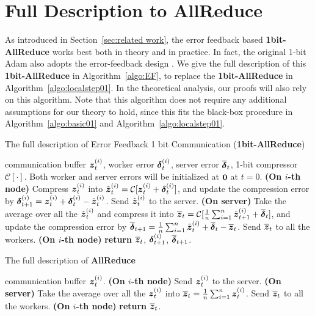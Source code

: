 \section{Full Description to AllReduce}
\label{appendix:sec:algorithm}

As introduced in Section~\ref{sec:related work}, the error feedback based \textbf{1bit-AllReduce} works best both in theory and in practice. In fact, the original 1-bit Adam also adopts the error-feedback design \citep{tang20211}. We give the full description of this \textbf{1bit-AllReduce} in Algorithm~\ref{algo:EF}, to replace the \textbf{1bit-AllReduce} in Algorithm~\ref{algo:localstep01}. In the theoretical analysis, our proofs will also rely on this algorithm. Note that this algorithm does not require any additional assumptions for our theory to hold, since this fits the black-box procedure in Algorithm~\ref{algo:basic01} and Algorithm~\ref{algo:localstep01}.

\begin{algorithm}[ht!]
	\caption{The full description of Error Feedback 1 bit Communication (\textbf{1bit-AllReduce})}\label{algo:EF}
	\begin{algorithmic}[1]
		\Require communication buffer $\boldsymbol{z}_{t}^{(i)}$, worker error $\boldsymbol{\delta}_{t}^{(i)}$, server error $\overline{\boldsymbol{\delta}}_{t}$, 1-bit compressor $\mathcal{C}[\cdot]$. Both worker and server errors will be initialized at $\boldsymbol{0}$ at $t=0$.
	    \State \textbf{(On $i$-th node)}
	    \State Compress $\boldsymbol{z}^{(i)}_{t}$ into $\hat{\boldsymbol{z}}^{(i)}_{t}=\mathcal{C}[\boldsymbol{z}^{(i)}_{t}+\boldsymbol{\delta}^{(i)}_{t}]$, and update the compression error by $\boldsymbol{\delta}^{(i)}_{t+1} = \boldsymbol{z}^{(i)}_{t}+\boldsymbol{\delta}^{(i)}_{t} - \hat{\boldsymbol{z}}^{(i)}_{t}$.
	    \State Send $\hat{\boldsymbol{z}}^{(i)}_{t}$ to the server.
	    \State \textbf{(On server)}
	    \State Take the average over all the $\hat{\boldsymbol{z}}^{(i)}_{t}$ and compress it into $\overline{\boldsymbol{z}}_{t} = \mathcal{C}[\frac{1}{n}\sum_{i=1}^{n}\hat{\boldsymbol{z}}^{(i)}_{t+1} + \overline{\boldsymbol{\delta}}_{t}]$, and update the compression error by $\overline{\boldsymbol{\delta}}_{t+1} = \frac{1}{n}\sum_{i=1}^{n}\hat{\boldsymbol{z}}^{(i)}_{t} + \overline{\boldsymbol{\delta}}_{t} - \overline{\boldsymbol{z}}_{t}$.
	    \State Send $\overline{\boldsymbol{z}}_{t}$ to all the workers.
	    \State \textbf{(On $i$-th node)}
		\State \textbf{return} $\overline{\boldsymbol{z}}_{t}$, $\boldsymbol{\delta}_{t+1}^{(i)}$, $\overline{\boldsymbol{\delta}}_{t+1}$.
	\end{algorithmic}
\end{algorithm}

\begin{algorithm}[ht!]
	\caption{The full description of \textbf{AllReduce}}\label{algo:AllReduce}
	\begin{algorithmic}[1]
		\Require communication buffer $\boldsymbol{z}_{t}^{(i)}$.
	    \State \textbf{(On $i$-th node)}
	    \State Send $\boldsymbol{z}^{(i)}_{t}$ to the server.
	    \State \textbf{(On server)}
	    \State Take the average over all the ${\boldsymbol{z}}^{(i)}_{t}$ into $\overline{\boldsymbol{z}}_{t} = \frac{1}{n}\sum_{i=1}^{n}{\boldsymbol{z}}^{(i)}_{t}$.
	    \State Send $\overline{\boldsymbol{z}}_{t}$ to all the workers.
	    \State \textbf{(On $i$-th node)}
		\State \textbf{return} $\overline{\boldsymbol{z}}_{t}$.
	\end{algorithmic}
\end{algorithm}